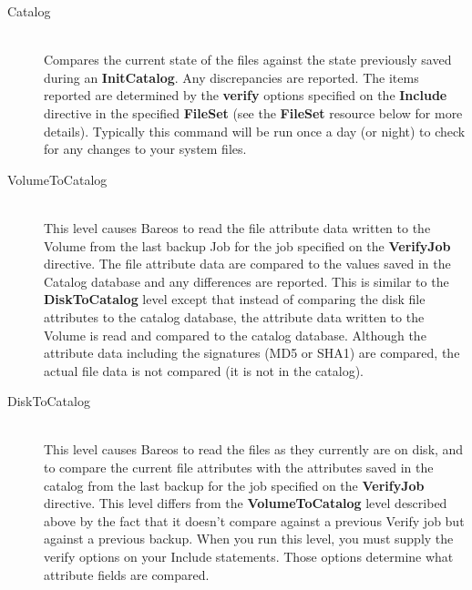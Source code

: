 \begin{description}
\begin{description}
\item [Catalog] \hfill \\
Compares the current state of the files against the state previously
saved during an {\bf InitCatalog}.  Any discrepancies are reported.  The
items reported are determined by the {\bf verify} options specified on
the {\bf Include} directive in the specified {\bf FileSet} (see the {\bf
FileSet} resource below for more details).  Typically this command will
be run once a day (or night) to check for any changes to your system
files.


\item [VolumeToCatalog] \hfill \\
This level causes Bareos to read the file attribute data written to the
Volume from the last backup Job for the job specified on the {\bf VerifyJob}
directive.  The file attribute data are compared to the
values saved in the Catalog database and any differences are reported.
This is similar to the {\bf DiskToCatalog} level except that instead of
comparing the disk file attributes to the catalog database, the
attribute data written to the Volume is read and compared to the catalog
database.  Although the attribute data including the signatures (MD5 or
SHA1) are compared, the actual file data is not compared (it is not in
the catalog).


\item [DiskToCatalog] \hfill \\
This level causes Bareos to read the files as they currently are on
disk, and to compare the current file attributes with the attributes
saved in the catalog from the last backup for the job specified on the
{\bf VerifyJob} directive.  This level differs from the {\bf VolumeToCatalog}
level described above by the fact that it doesn't compare against a
previous Verify job but against a previous backup.  When you run this
level, you must supply the verify options on your Include statements.
Those options determine what attribute fields are compared.


\end{description}
\end{description}
